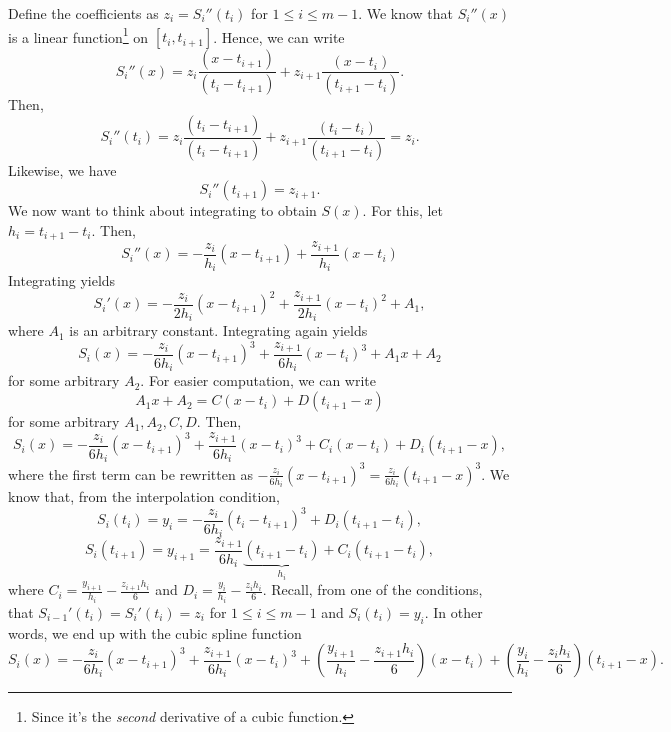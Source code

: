 \documentclass[letterpaper]{article}
\begin{document}
Define the coefficients as $z_i = S_{i}''(t_i)$ for $1 \leq i \leq m - 1$. We know that $S_{i}''(x)$ is a linear function\footnote{Since it's the \emph{second} derivative of a cubic function.} on $[t_i, t_{i + 1}]$. Hence, we can write 
\[S_{i}''(x) = z_i \frac{(x - t_{i + 1})}{(t_i - t_{i + 1})} + z_{i + 1}\frac{(x - t_i)}{(t_{i + 1} - t_i)}.\]
Then, 
\[S_{i}''(t_i) = z_i \frac{(t_i - t_{i + 1})}{(t_i - t_{i + 1})} + z_{i + 1}\frac{(t_i - t_i)}{(t_{i + 1} - t_i)} = z_i.\]
Likewise, we have 
\[S_{i}''(t_{i + 1}) = z_{i + 1}.\]
We now want to think about integrating to obtain $S(x)$. For this, let $h_i = t_{i + 1} - t_i$. Then,
\[S_{i}''(x) = -\frac{z_i}{h_i}(x - t_{i + 1}) + \frac{z_{i + 1}}{h_i}(x - t_i)\]
Integrating yields
\[S_{i}'(x) = -\frac{z_i}{2h_i}(x - t_{i + 1})^2 + \frac{z_{i + 1}}{2h_i}(x - t_i)^2 + A_1,\]
where $A_1$ is an arbitrary constant. Integrating again yields  
\[S_i (x) = -\frac{z_i}{6h_i}(x - t_{i + 1})^3 + \frac{z_{i + 1}}{6h_i} (x - t_i)^3 + A_1 x + A_2\]
for some arbitrary $A_2$. For easier computation, we can write 
\[A_1 x + A_2 = C (x - t_i) + D (t_{i + 1} - x)\]
for some arbitrary $A_1, A_2, C, D$. Then, 
\[S_{i}(x) = -\frac{z_i}{6h_i}(x - t_{i + 1})^3 + \frac{z_{i + 1}}{6h_i} (x - t_i)^3 + C_i (x - t_i) + D_i (t_{i + 1} - x),\]
where the first term can be rewritten as $-\frac{z_i}{6h_i}(x - t_{i + 1})^3 = \frac{z_i}{6h_i}(t_{i + 1} - x)^3$. We know that, from the interpolation condition, 
\[S_{i}(t_i) = y_i = -\frac{z_i}{6h_i} (t_i - t_{i + 1})^3 + D_i(t_{i + 1} - t_i),\]
\[S_{i}(t_{i + 1}) = y_{i + 1} = \frac{z_{i + 1}}{6h_i} \underbrace{(t_{i + 1} - t_i)}_{h_i} + C_i(t_{i + 1} - t_i),\]
where $C_i = \frac{y_{i + 1}}{h_i} - \frac{z_{i + 1} h_i}{6}$ and $D_i = \frac{y_i}{h_i} - \frac{z_i h_i}{6}$. Recall, from one of the conditions, that $S_{i - 1}'(t_i) = S_{i}'(t_i) = z_i$ for $1 \leq i \leq m - 1$ and $S_{i}(t_i) = y_i$. In other words, we end up with the cubic spline function 
\begin{equation}\label{lec13spline}
    S_{i}(x) = -\frac{z_i}{6h_i}(x - t_{i + 1})^3 + \frac{z_{i + 1}}{6h_i} (x - t_i)^3 + \left(\frac{y_{i + 1}}{h_i} - \frac{z_{i + 1}h_i}{6}\right) (x - t_i) + \left(\frac{y_i}{h_i} - \frac{z_i h_i}{6}\right) (t_{i + 1} - x).
\end{equation}
\end{document}
